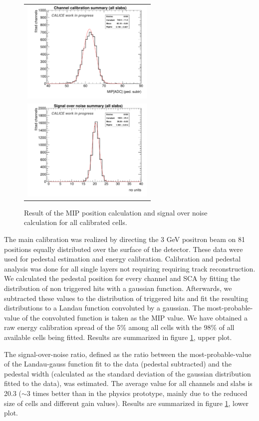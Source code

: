 \documentclass[journal]{IEEEtran}
\begin{document}
\begin{figure}[!t]
  \centering
  \begin{tabular}{l}
    \includegraphics[width=2.5in]{mipsummary-eps-converted-to.pdf}  \\
    \includegraphics[width=2.5in]{snsummary-eps-converted-to.pdf}
  \end{tabular}
\caption{Result of the MIP position calculation and signal over noise calculation for all calibrated cells.}
\label{mipandSN}
\end{figure}
  
The main calibration was realized 
by directing the 3 GeV positron beam on 81 positions equally distributed over the surface of the detector.
These data were used for pedestal estimation and energy calibration.
Calibration and pedestal analysis was done for all single layers not requiring requiring track reconstruction.
We calculated the pedestal position for every channel and SCA by fitting the distribution of non triggered hits with a gaussian function.
Afterwards, we subtracted these values to the distribution of triggered hits and fit the resulting distributions to a Landau function convoluted by a gaussian.
The most-probable-value of the convoluted function is taken as the MIP value.
We have obtained a raw energy calibration spread of the 5\% among all cells with the 98\% of all available cells being fitted. Results are summarized in figure \ref{mipandSN}, upper plot.

The signal-over-noise ratio, defined as the ratio between the most-probable-value of
the Landau-gauss function fit to the data (pedestal subtracted) and the pedestal width
(calculated as the standard deviation of the gaussian distribution fitted to the data), was estimated.
The average value for all channels and slabs is 20.3 ($\sim 3$ times better than in the physics prototype, mainly due to the reduced size of cells and different gain values).
Results are summarized in figure \ref{mipandSN}, lower plot.
\end{document}
